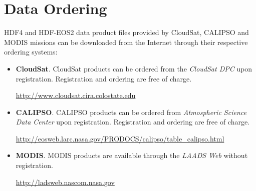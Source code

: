 \section{Data Ordering}
HDF4 and HDF-EOS2 data product files provided by CloudSat, CALIPSO and MODIS missions can be downloaded from the Internet through their
respective ordering systems:
\begin{itemize}
\item\textbf{CloudSat}. CloudSat products can be ordered from the \textit{CloudSat DPC} upon registration. Registration and ordering are free of charge.

\url{http://www.cloudsat.cira.colostate.edu}

\item\textbf{CALIPSO}. CALIPSO products can be ordered from \textit{Atmospheric Science Data Center} upon registration. Registration and ordering are free of charge.

\url{http://eosweb.larc.nasa.gov/PRODOCS/calipso/table_calipso.html}

\item\textbf{MODIS}. MODIS products are available through the \textit{LAADS Web} without registration. 

\url{http://ladsweb.nascom.nasa.gov}
\end{itemize}
